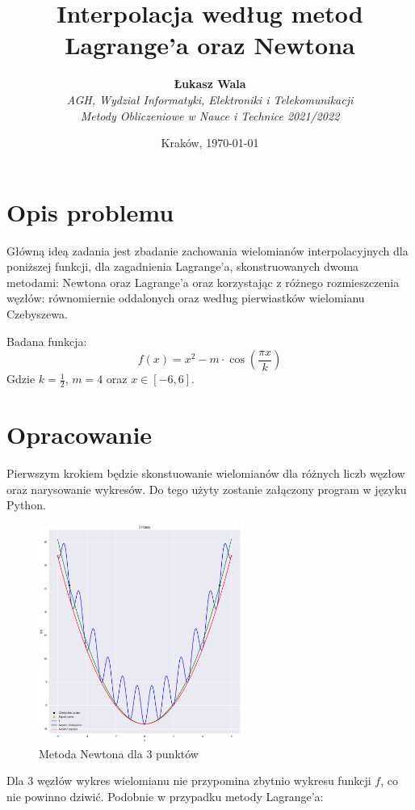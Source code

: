 \documentclass{article}
\title{Interpolacja według metod Lagrange'a oraz Newtona}
\author{\textbf{Łukasz Wala}\\
    \textit{AGH, Wydział Informatyki, Elektroniki i Telekomunikacji} \\
    \textit{Metody Obliczeniowe w Nauce i Technice 2021/2022}}
\date{Kraków, \today}
\begin{document}
\maketitle

\section{Opis problemu}
Główną ideą zadania jest zbadanie zachowania wielomianów interpolacyjnych dla poniższej funkcji, dla zagadnienia Lagrange'a, skonstruowanych dwoma metodami: Newtona oraz 
Lagrange'a oraz korzystając z różnego rozmieszczenia węzłów: równomiernie oddalonych oraz według pierwiastków wielomianu Czebyszewa.

Badana funkcja:
\[f(x)=x^2-m\cdot\cos\left(\frac{\pi x}{k}\right)\]
Gdzie $k=\frac{1}{2}$, $m=4$ oraz $x\in [-6,6]$.


\section{Opracowanie}
Pierwszym krokiem będzie skonstuowanie wielomianów dla różnych liczb węzłow oraz narysowanie wykresów. 
Do tego użyty zostanie załączony program w języku Python. 

\begin{figure}[H]
    \centering
    \includegraphics[width=0.6\textwidth]{img/newt_3.png}
    \caption{Metoda Newtona dla 3 punktów}
\end{figure}

Dla 3 węzłów wykres wielomianu nie przypomina zbytnio wykresu funkcji $f$, co nie powinno dziwić. Podobnie w przypadku metody Lagrange'a:
\end{document}
